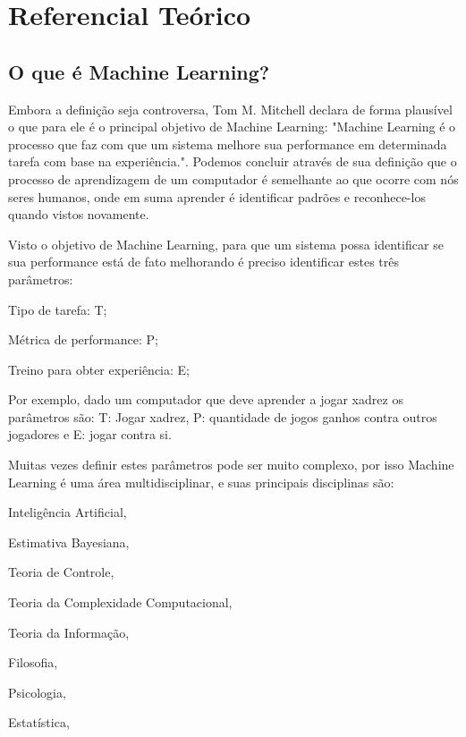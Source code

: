 \chapter{Referencial Teórico}
\label{cap:referencial-reorico}

\section{O que é Machine Learning?}
\label{sec:oqueemachinelearning}

Embora a definição seja controversa, Tom M. Mitchell declara de forma plausível o que para ele é o principal objetivo de Machine Learning: "Machine Learning é o processo que faz com que um sistema melhore sua performance em determinada tarefa com base na experiência.". Podemos concluir através de sua definição que o processo de aprendizagem de um computador é semelhante ao que ocorre com nós seres humanos, onde em suma aprender é identificar padrões e reconhece-los quando vistos novamente.

Visto o objetivo de Machine Learning, para que um sistema possa identificar se sua performance está de fato melhorando é preciso identificar estes três parâmetros:
 \begin{alineascomponto}
	\item Tipo de tarefa: T;
	\item Métrica de performance: P;
	\item Treino para obter experiência: E;			
\end{alineascomponto}
Por exemplo, dado um computador que deve aprender a jogar xadrez os parâmetros são: T: Jogar xadrez, P: quantidade de jogos ganhos contra outros jogadores e
E: jogar contra si.

Muitas vezes definir estes parâmetros pode ser muito complexo, por isso Machine Learning é uma área multidisciplinar, e suas principais disciplinas são: 
 
 \begin{alineascomponto}
	\item Inteligência Artificial, 
	\item Estimativa Bayesiana, 
	\item Teoria de Controle, 
	\item Teoria da Complexidade Computacional, 
	\item Teoria da Informação, 
	\item Filosofia, 
	\item Psicologia, 
	\item Estatística, 
\end{alineascomponto}